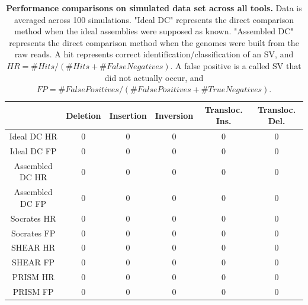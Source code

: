 \documentclass{easychithesis}
\begin{document}
\begin{table}[h]
\begin{center}
\begin{tabular}{|c|c|c|c|c|c|}\hline
         & Deletion & Insertion & Inversion & Transloc. Ins. & Transloc. Del.\\
        \hline 
        Ideal DC HR & 0 & 0 & 0 & 0 & 0\\
        Ideal DC FP & 0 & 0 & 0 & 0 & 0\\
        \hline 
        Assembled DC HR & 0 & 0 & 0 & 0 & 0\\
        Assembled DC FP & 0 & 0 & 0 & 0 & 0\\
        \hline
        Socrates HR & 0 & 0 & 0 & 0 & 0\\
        Socrates FP & 0 & 0 & 0 & 0 & 0\\
        \hline
        SHEAR HR & 0 & 0 & 0 & 0 & 0\\
        SHEAR FP & 0 & 0 & 0 & 0 & 0\\
        \hline
        PRISM HR & 0 & 0 & 0 & 0 & 0\\
        PRISM FP & 0 & 0 & 0 & 0 & 0\\
	\hline
\end{tabular}
\caption{{\bf Performance comparisons on simulated data set across all tools.} Data is averaged across 100 simulations. "Ideal DC" represents the direct comparison method when the ideal assemblies were supposed as known. "Assembled DC" represents the direct comparison method when the genomes were built from the raw reads. A hit represents correct identification/classification of an SV, and $HR = \# Hits / (\# Hits + \# False Negatives)$. A false positive is a called SV that did not actually occur, and $FP = \# False Positives / (\# False Positives + \# True Negatives)$.}
\end{center}
\end{table}
\end{document}
